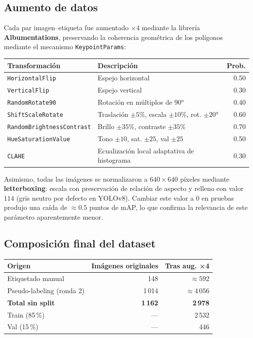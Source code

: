 \documentclass[12pt,a4paper]{article}
\begin{document}
\subsection{Aumento de datos}

Cada par imagen–etiqueta fue aumentado $\times 4$ mediante la librería
\textbf{Albumentations}, preservando la coherencia geométrica de los polígonos
mediante el mecanismo \texttt{KeypointParams}:

\begin{center}
\begin{tabular}{llr}
  \toprule
  \textbf{Transformación} & \textbf{Descripción} & \textbf{Prob.} \\
  \midrule
  \texttt{HorizontalFlip}          & Espejo horizontal                             & 0.50 \\
  \texttt{VerticalFlip}            & Espejo vertical                               & 0.30 \\
  \texttt{RandomRotate90}          & Rotación en múltiplos de 90°                  & 0.40 \\
  \texttt{ShiftScaleRotate}        & Traslación $\pm 5\%$, escala $\pm 10\%$, rot. $\pm 20°$ & 0.60 \\
  \texttt{RandomBrightnessContrast}& Brillo $\pm 35\%$, contraste $\pm 35\%$      & 0.70 \\
  \texttt{HueSaturationValue}      & Tono $\pm 10$, sat. $\pm 25$, val $\pm 25$   & 0.50 \\
  \texttt{CLAHE}                   & Ecualización local adaptativa de histograma   & 0.30 \\
  \bottomrule
\end{tabular}
\end{center}

Asimismo, todas las imágenes se normalizaron a $640\times 640$ píxeles mediante
\textbf{letterboxing}: escala con preservación de relación de aspecto y relleno con
valor $114$ (gris neutro por defecto en YOLOv8). Cambiar este valor a 0 en pruebas
produjo una caída de $\approx 0.5$ puntos de mAP, lo que confirma la relevancia de
este parámetro aparentemente menor.

\subsection{Composición final del dataset}

\begin{center}
\begin{tabular}{lrr}
  \toprule
  \textbf{Origen} & \textbf{Imágenes originales} & \textbf{Tras aug. ×4} \\
  \midrule
  Etiquetado manual        & 148    & $\approx 592$   \\
  Pseudo-labeling (ronda 2)& 1\,014 & $\approx 4\,056$ \\
  \midrule
  \textbf{Total sin split} & \textbf{1\,162} & \textbf{2\,978} \\
  \midrule
  Train (85\,\%)           & —      & 2\,532 \\
  Val   (15\,\%)           & —      &   446 \\
  \bottomrule
\end{tabular}
\end{center}
\end{document}
